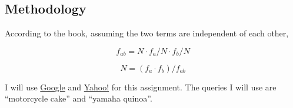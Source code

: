 \documentclass[10pt,letterpaper,bibliography=totoc]{scrartcl}
\begin{document}
\subsection{Methodology}
According to the book\cite{classtext}, assuming the two terms are independent of each other,

\begin{equation}\label{eq:numindexedpages1}
  f_{ab} = N \cdot f_a/N \cdot f_b/N
\end{equation}

\begin{equation}\label{eq:numindexedpages2}
    N = (f_{a} \cdot f_{b}) / f_{ab}
\end{equation}

I will use \href{www.google.com}{Google} and \href{www.yahoo.com}{Yahoo!} for this assignment. The queries I will use are ``motorcycle cake'' and ``yamaha quinoa''. 
\end{document}
